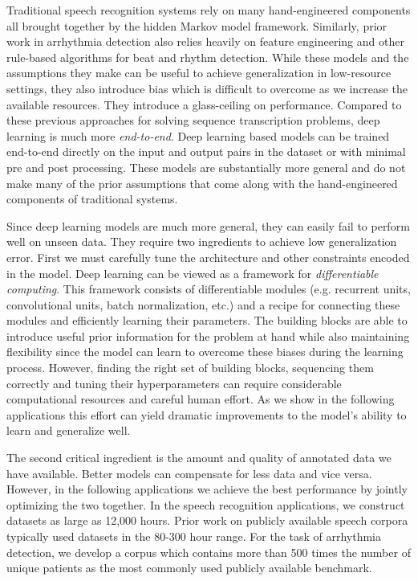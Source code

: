 Traditional speech recognition systems rely on many hand-engineered components
all brought together by the hidden Markov model framework. Similarly, prior
work in arrhythmia detection also relies heavily on feature engineering and
other rule-based algorithms for beat and rhythm detection. While these models
and the assumptions they make can be useful to achieve generalization in
low-resource settings, they also introduce bias which is difficult to overcome
as we increase the available resources. They introduce a glass-ceiling on
performance.  Compared to these previous approaches for solving sequence
transcription problems, deep learning is much more {\it end-to-end}. Deep
learning based models can be trained end-to-end directly on the input and
output pairs in the dataset or with minimal pre and post processing. These
models are substantially more general and do not make many of the prior
assumptions that come along with the hand-engineered components of traditional
systems.

Since deep learning models are much more general, they can easily fail to
perform well on unseen data. They require two ingredients to achieve low
generalization error. First we must carefully tune the architecture and other
constraints encoded in the model. Deep learning can be viewed as a framework
for {\it differentiable computing}. This framework consists of differentiable
modules (e.g. recurrent units, convolutional units, batch normalization, etc.)
and a recipe for connecting these modules and efficiently learning their
parameters.  The building blocks are able to introduce useful prior information
for the problem at hand while also maintaining flexibility since the model can
learn to overcome these biases during the learning process. However, finding
the right set of building blocks, sequencing them correctly and tuning their
hyperparameters can require considerable computational resources and careful
human effort. As we show in the following applications this effort can yield
dramatic improvements to the model's ability to learn and generalize well.

The second critical ingredient is the amount and quality of annotated data we
have available. Better models can compensate for less data and vice versa.
However, in the following applications we achieve the best performance by
jointly optimizing the two together. In the speech recognition applications, we
construct datasets as large as 12,000 hours. Prior work on publicly available
speech corpora typically used datasets in the 80-300 hour range. For the task
of arrhythmia detection, we develop a corpus which contains more than 500 times
the number of unique patients as the most commonly used publicly available
benchmark.

